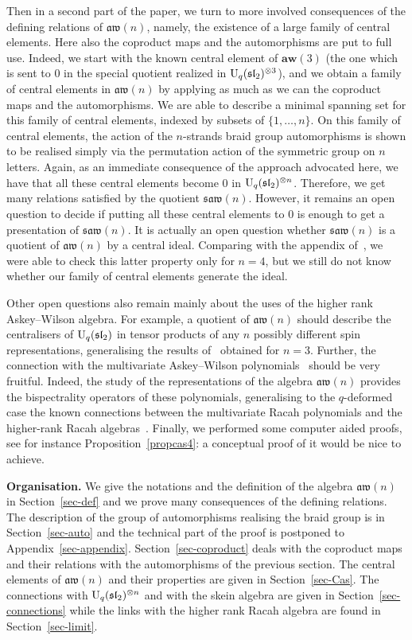 \documentclass[10pt,a4paper]{amsart}
\numberwithin{equation}{section}
\theoremstyle{definition}
\newcommand{\aw}{\mathfrak{aw}(n)}
\newcommand{\saw}{\mathfrak{saw}(n)}
\begin{document}
Then in a second part of the paper, we turn to more involved consequences of the defining relations of $\aw$, namely, the existence of a large family of central elements.
Here also the coproduct maps and the automorphisms are put to full use. Indeed, we start with the known central element of $\textbf{aw}(3)$ \big(the one which is sent to $0$ in the special quotient realized in ${\rm U}_q(\mathfrak{sl}_2)^{\otimes 3}$\big),
and we obtain a family of central elements in $\aw$ by applying as much as we can the coproduct maps and the automorphisms. We are able to describe a minimal spanning set for this family of central elements,
indexed by subsets of $\{1,\dots,n\}$. On this family of central elements, the action of the $n$-strands braid group automorphisms is shown to be realised simply via the permutation action of the symmetric group on $n$ letters.
Again, as an immediate consequence of the approach advocated here, we have that all these central elements become $0$ in ${\rm U}_q(\mathfrak{sl}_2)^{\otimes n}$.
Therefore, we get many relations satisfied by the quotient $\saw$. However, it remains an open question to decide if putting all these central elements to 0 is enough to get a presentation of $\saw$.
It is actually an open question whether $\saw$ is a quotient of $\aw$ by a central ideal. Comparing with the appendix of~\cite{CL}, we were able to check this latter property only for $n=4$, but we still do not know whether our family of central elements generate the ideal.

Other open questions also remain mainly about the uses of the higher rank Askey--Wilson algebra. For example, a quotient of $\aw$ should describe the centralisers of ${\rm U}_q(\mathfrak{sl}_2)$
in tensor products of any $n$ possibly different spin representations, generalising the results of~\cite{CPVZ, CVZ2} obtained for $n=3$.
Further, the connection with the multivariate Askey--Wilson polynomials~\cite{GI2,G, Ili} should be very fruitful. Indeed, the
study of the representations of the algebra $\aw$ provides the bispectrality operators of these polynomials,
generalising to the $q$-deformed case the known connections between the multivariate Racah polynomials and the higher-rank Racah algebras~\cite{CFR}. Finally, we performed some computer aided proofs, see for instance Proposition~\ref{propcas4}: a conceptual proof of it would be nice to achieve.



{\bf Organisation.} We give the notations and the definition of the algebra $\aw$ in Section~\ref{sec-def} and we prove many consequences of the defining relations.
The description of the group of automorphisms realising the braid group is in Section~\ref{sec-auto} and the technical part of the proof is postponed to Appendix~\ref{sec-appendix}.
Section~\ref{sec-coproduct} deals with the coproduct maps and their relations with the automorphisms of the previous section.
The central elements of $\aw$ and their properties are given in Section~\ref{sec-Cas}. The connections with ${\rm U}_q(\mathfrak{sl}_2)^{\otimes n}$ and with the skein algebra are given in Section~\ref{sec-connections} while
the links with the higher rank Racah algebra are found in Section~\ref{sec-limit}.
\end{document}
